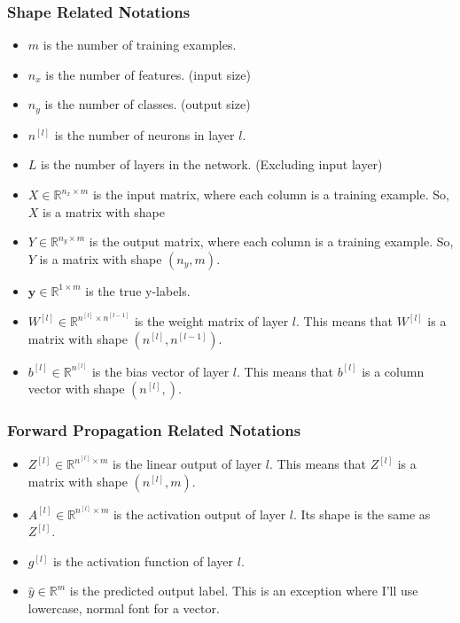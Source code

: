 \documentclass[12pt]{article}
\begin{document}
\subsubsection{Shape Related Notations}
\begin{itemize}
    \item
          \(m\) is the number of training examples.
    \item
          \(n_x\) is the number of features. (input size)
    \item
          \(n_y\) is the number of classes. (output size)
    \item
          \(n^{[l]}\) is the number of neurons in layer \(l\).
    \item
          \(L\) is the number of layers in the network. (Excluding input layer)
    \item
          \(X\in \mathbb{R}^{n_x\times m}\) is the input matrix, where each
          column is a training example. So, \(X\) is a matrix with shape
    \item
          \(Y \in \mathbb{R}^{n_y\times m}\) is the output matrix, where each
          column is a training example. So, \(Y\) is a matrix with shape
          \((n_y, m)\).
    \item
          \(\mathbf{y} \in \mathbb{R}^{1\times m}\) is the true y-labels.
    \item
          \(W^{[l]}\in \mathbb{R}^{n^{[l]}\times n^{[l-1]}}\) is the weight
          matrix of layer \(l\). This means that \(W^{[l]}\) is a matrix with
          shape \((n^{[l]}, n^{[l-1]})\).
    \item
          \(b^{[l]}\in \mathbb{R}^{n^{[l]}}\) is the bias vector of layer \(l\).
          This means that \(b^{[l]}\) is a column vector with shape
          \((n^{[l]}, )\).
\end{itemize}

\subsubsection{Forward Propagation Related Notations}
\begin{itemize}
    \item
          \(Z^{[l]}\in \mathbb{R}^{n^{[l]}\times m}\) is the linear output of
          layer \(l\). This means that \(Z^{[l]}\) is a matrix with shape
          \((n^{[l]}, m)\).
    \item
          \(A^{[l]}\in \mathbb{R}^{n^{[l]}\times m}\) is the activation output
          of layer \(l\). Its shape is the same as \(Z^{[l]}\).
    \item
          \(g^{[l]}\) is the activation function of layer \(l\).
    \item
          \(\hat{y} \in \mathbb{R}^{m}\) is the predicted output label. This is
          an exception where I'll use lowercase, normal font for a vector.
\end{itemize}
\end{document}
